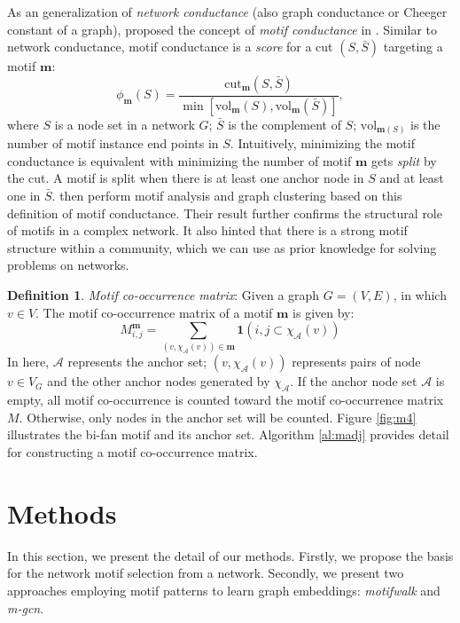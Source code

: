 \documentclass{article}
\theoremstyle{definition}
\newtheorem{definition}{Definition}[section]
\begin{document}
As an generalization of \emph{network conductance} (also graph conductance 
or Cheeger constant of a graph), \citeauthor{juremotif} proposed
the concept of \emph{motif conductance} in \cite{juremotif}. Similar to
network conductance, motif conductance is a \emph{score} for a cut 
$(S, \bar{S})$ targeting a motif $\mathbf{m}$:
\begin{equation*}
	\phi_{\mathbf{m}}(S) = \frac{\mbox{cut}_{\mathbf{m}}(S,\bar{S})}{\min[\mbox{vol}_{\mathbf{m}}(S), \mbox{vol}_{\mathbf{m}}(\bar{S})]},
\end{equation*}
where $S$ is a node set in a network $G$; $\bar{S}$ is the complement
of $S$; $\mbox{vol}_{\mathbf{m}(S)}$ is the number of motif instance
end points in $S$. Intuitively, minimizing the motif conductance is
equivalent with minimizing the number of motif $\mathbf{m}$ gets 
\emph{split} by the cut. A motif is split when there is at least one
anchor node in $S$ and at least one in $\bar{S}$. \citeauthor{juremotif}
then perform motif analysis and graph clustering based on this
definition of motif conductance. Their result further confirms the
structural role of motifs in a complex network. It also hinted that there
is a strong motif structure within a community, which we can use as
prior knowledge for solving problems on networks.

\begin{definition} \emph{Motif co-occurrence matrix}:
Given a graph $G = (V,E)$, in which $v \in V$. The motif co-occurrence 
matrix of a motif $\mathbf{m}$ is given by:
$$M_{i,j}^{\mathbf{m}} = \sum_{(v, \chi_{\mathcal{A}}(v)) \in \mathbf{m}} \mathbf{1}({i,j} \subset \chi_\mathcal{A}(v))$$
In here, $\mathcal{A}$ represents the anchor set; 
$(v, \chi_{\mathcal{A}}(v))$ represents pairs of node $v \in V_G$ and the 
other anchor nodes generated by $\chi_\mathcal{A}$. If the anchor node set 
$\mathcal{A}$ is empty, all motif co-occurrence is counted toward the 
motif co-occurrence matrix $M$. Otherwise, only nodes in the anchor set 
will be counted. Figure \ref{fig:m4} illustrates the bi-fan motif and 
its anchor set. Algorithm \ref{al:madj} provides detail for constructing
a motif co-occurrence matrix.
\end{definition}


\section{Methods}

In this section, we present the detail of our methods. Firstly,
we propose the basis for the network motif selection from a network.
Secondly, we present two approaches employing motif patterns to
learn graph embeddings: \emph{motifwalk} and \emph{m-gcn}.
\end{document}
